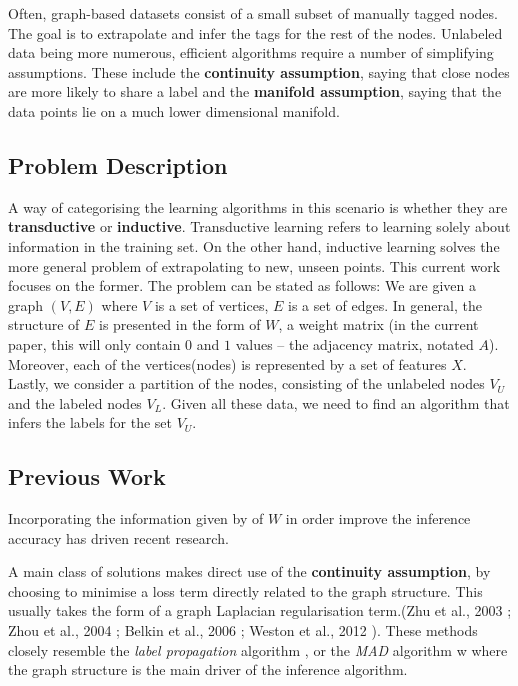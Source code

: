 \documentclass[10pt,a4]{article}
\begin{document}
    Often, graph-based datasets consist of a small subset of manually 
    tagged nodes. The goal is to extrapolate and infer the tags for the rest of 
    the nodes. 
    Unlabeled data being more numerous, efficient algorithms require a number of 
    simplifying assumptions. These include 
    the  \textbf{continuity assumption}, saying that close nodes are more likely 
    to share  a label  and the \textbf{manifold assumption}, saying that the data 
    points lie on a much lower dimensional manifold. \cite{chapelle2009semi} 
    
    \subsection{Problem Description}

    A way of categorising the learning algorithms in this scenario is 
    whether they are \textbf{transductive} or \textbf{inductive}. Transductive 
    learning refers to learning solely about information in the training set. On 
    the other hand, inductive learning solves the more general problem of 
    extrapolating to new, unseen points. This current work 
    focuses on the former. The problem can be stated as follows: 
    We are given a graph $(V, E)$ where $V$ is a set of vertices, $E$ is a set of 
    edges. In general, the structure of $E$ is presented in the form of $W$, 
    a weight matrix (in the current paper, this will only contain
    $0$ and $1$ values -- the adjacency matrix, notated $A$). Moreover, each of 
    the vertices(nodes) is represented by a set of features $X$. Lastly, we consider 
    a partition of the nodes, consisting of the unlabeled nodes $V_U$ and the 
    labeled nodes $V_L$. Given all these data, we need to find an algorithm that 
    infers the labels for the set $V_U$.
    
    \subsection{Previous Work}

    Incorporating the information given by of $W$ in order improve the inference 
    accuracy has driven recent research. 
    
    A main class of solutions makes direct use of the \textbf{continuity assumption}, 
    by choosing to minimise a loss term directly related to the graph structure. 
    This usually takes the form of a graph Laplacian regularisation term.(Zhu et al.,
    2003 \cite{zhu2003semi}; Zhou et al., 2004 \cite{zhou2004learning}; 
    Belkin et al., 2006 \cite{belkin2006manifold}; Weston et al., 2012 
    \cite{weston2012deep}). These methods closely resemble the \emph{label propagation} 
    algorithm \cite{zhu2002learning}, or the \emph{MAD} \cite{talukdar2009new} algorithm w
    where the graph structure is the main driver of the inference algorithm.
    
\end{document}
